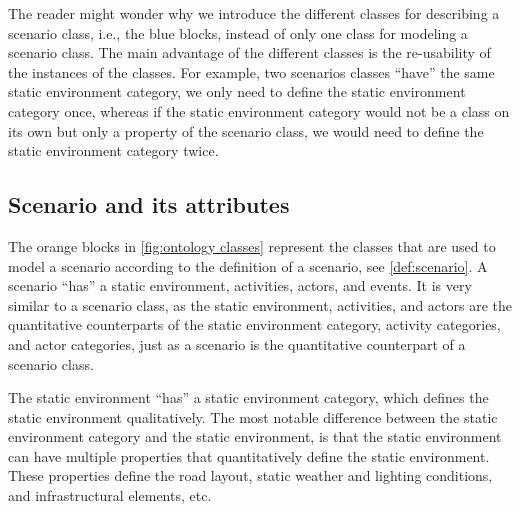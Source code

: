 \cbstart
The reader might wonder why we introduce the different classes for describing a scenario class, i.e., the blue blocks, instead of only one class for modeling a scenario class. 
The main advantage of the different classes is the re-usability of the instances of the classes. For example, two scenarios classes ``have'' the same static environment category, we only need to define the static environment category once, whereas if the static environment category would not be a class on its own but only a property of the scenario class, we would need to define the static environment category twice.
\cbend


\subsection{Scenario and its attributes}
\label{sec:domain scenario}

The orange blocks in \cref{fig:ontology classes} represent the classes that are used to model a scenario according to the definition of a scenario, see \cref{def:scenario}. A scenario ``has'' a static environment, activities, actors, and events. It is very similar to a scenario class, as the static environment, activities, and actors are the quantitative counterparts of the static environment category, activity categories, and actor categories, just as a scenario is the quantitative counterpart of a scenario class. 

The static environment ``has'' a static environment category, which defines the static environment qualitatively. The most notable difference between the static environment category and the static environment, is that the static environment can have multiple properties that quantitatively define the static environment. These properties define the road layout, static weather and lighting conditions, and infrastructural elements, etc.


